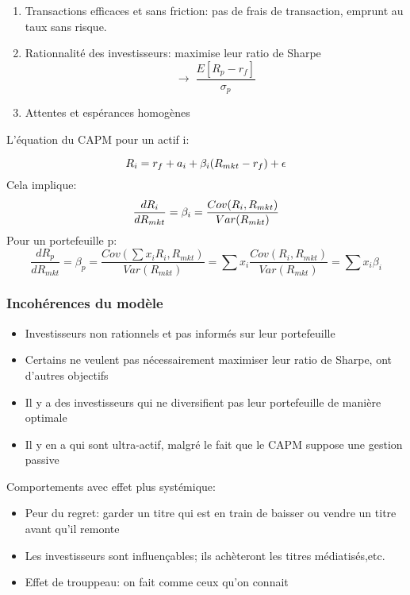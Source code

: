 \documentclass[]{book}
\providecommand{\tightlist}{%
  \setlength{\itemsep}{0pt}\setlength{\parskip}{0pt}}
\theoremstyle{definition}
\theoremstyle{definition}
\theoremstyle{definition}
\theoremstyle{remark}
\begin{document}
\begin{enumerate}
\def\labelenumi{\arabic{enumi}.}
\tightlist
\item
  Transactions efficaces et sans friction: pas de frais de transaction,
  emprunt au taux sans risque.
\item
  Rationnalité des investisseurs: maximise leur ratio de Sharpe \[
  \rightarrow\; \frac{E[R_p- r_f]}{\sigma_p}
  \]
\item
  Attentes et espérances homogènes
\end{enumerate}

L'équation du CAPM pour un actif \(\mathrm{i}\):

\[
R_i =r_f+a_i+\beta_i(R_{mkt}-r_f)+\epsilon\\  
\] Cela implique:\\
\[
\frac{dR_i}{d R_{mkt}}=\beta_i=\frac{Cov(R_i,R_{mkt})}{Var(R_{mkt})}\\    
\] Pour un portefeuille p:\\
\[
\frac{dR_p}{d R_{mkt}}=\beta_p=\frac{Cov(\sum x_i R_i,R_{mkt})}{Var(R_{mkt})}=\sum x_i \frac{Cov(R_i,R_{mkt})}{Var(R_{mkt})}=\sum x_i \beta_i
\]

\subsubsection*{Incohérences du modèle}\label{incoherences-du-modele}

\begin{itemize}
\tightlist
\item
  Investisseurs non rationnels et pas informés sur leur portefeuille
\item
  Certains ne veulent pas nécessairement maximiser leur ratio de Sharpe,
  ont d'autres objectifs
\item
  Il y a des investisseurs qui ne diversifient pas leur portefeuille de
  manière optimale
\item
  Il y en a qui sont ultra-actif, malgré le fait que le CAPM suppose une
  gestion passive
\end{itemize}

Comportements avec effet plus systémique:

\begin{itemize}
\tightlist
\item
  Peur du regret: garder un titre qui est en train de baisser ou vendre
  un titre avant qu'il remonte
\item
  Les investisseurs sont influençables; ils achèteront les titres
  médiatisés,etc.
\item
  Effet de trouppeau: on fait comme ceux qu'on connait
\end{itemize}
\end{document}
